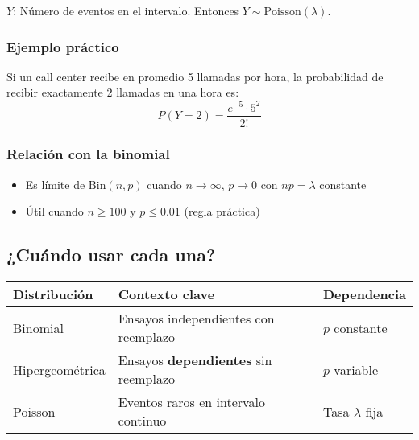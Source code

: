 \documentclass[letterpaper, 12pt]{article}
\begin{document}
	$Y$: Número de eventos en el intervalo. Entonces $Y \sim \text{Poisson}(\lambda)$.
	
	\subsubsection{Ejemplo práctico}
	Si un call center recibe en promedio 5 llamadas por hora, la probabilidad de recibir exactamente 2 llamadas en una hora es:
	\[
	P(Y=2) = \frac{e^{-5} \cdot 5^2}{2!}
	\]
	
	\subsubsection{Relación con la binomial}
	\begin{itemize}
		\item Es límite de $\text{Bin}(n,p)$ cuando $n \to \infty$, $p \to 0$ con $np = \lambda$ constante
		\item Útil cuando $n \geq 100$ y $p \leq 0.01$ (regla práctica)
	\end{itemize}
	
	\subsection{¿Cuándo usar cada una?}
	\begin{center}
		\begin{tabular}{|l|l|l|}
			\hline
			\textbf{Distribución} & \textbf{Contexto clave} & \textbf{Dependencia} \\ \hline
			Binomial & Ensayos independientes con reemplazo & $p$ constante \\ \hline
			Hipergeométrica & Ensayos \textbf{dependientes} sin reemplazo & $p$ variable \\ \hline
			Poisson & Eventos raros en intervalo continuo & Tasa $\lambda$ fija \\ \hline
		\end{tabular}
	\end{center}
	
	
\end{document}
